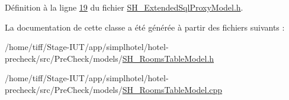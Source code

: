 Définition à la ligne \hyperlink{SH__ExtendedSqlProxyModel_8h_source_l00019}{19} du fichier \hyperlink{SH__ExtendedSqlProxyModel_8h_source}{S\-H\-\_\-\-Extended\-Sql\-Proxy\-Model.\-h}.



La documentation de cette classe a été générée à partir des fichiers suivants \-:\begin{DoxyCompactItemize}
\item 
/home/tiff/\-Stage-\/\-I\-U\-T/app/simplhotel/hotel-\/precheck/src/\-Pre\-Check/models/\hyperlink{SH__RoomsTableModel_8h}{S\-H\-\_\-\-Rooms\-Table\-Model.\-h}\item 
/home/tiff/\-Stage-\/\-I\-U\-T/app/simplhotel/hotel-\/precheck/src/\-Pre\-Check/models/\hyperlink{SH__RoomsTableModel_8cpp}{S\-H\-\_\-\-Rooms\-Table\-Model.\-cpp}\end{DoxyCompactItemize}
